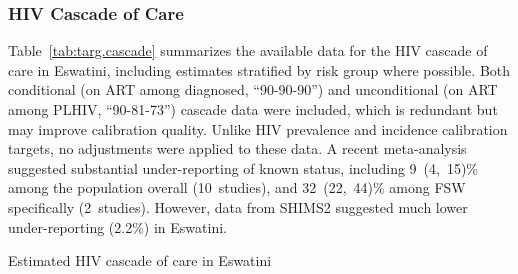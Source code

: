 \subsubsection{HIV Cascade of Care}\label{model.cal.targ.cascade}
Table~\ref{tab:targ.cascade} summarizes the available data for the HIV cascade of care in Eswatini,
including estimates stratified by risk group where possible.
Both conditional (\eg on ART among diagnosed, ``90-90-90'')
and unconditional (\eg on ART among PLHIV, ``90-81-73'') cascade data were included,
which is redundant but may improve calibration quality.
Unlike HIV prevalence and incidence calibration targets, no adjustments were applied to these data.
A recent meta-analysis \cite{Soni2021} suggested substantial under-reporting of known \hivp status,
including 9~(4,~15)\% among the population overall (10~studies),
and 32~(22,~44)\% among FSW specifically (2~studies).
However, data from SHIMS2 \cite{SHIMS2} suggested much lower under-reporting (2.2\%) in Eswatini.
\begin{table}
  \centering
  \caption{Estimated HIV cascade of care in Eswatini}
  \label{tab:targ.cascade}
  
\end{table}
\par
